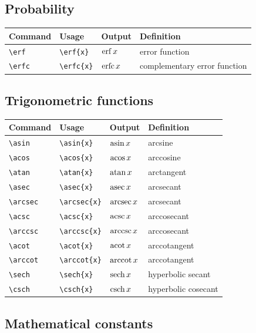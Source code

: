 \documentclass[11pt]{article}
\begin{document}
\subsection{Probability}

\begin{tabular}{llll}
    Command      & Usage           & Output     & Definition                   \\
    \hline
    \verb|\erf|  & \verb|\erf{x}|  & $\operatorname{erf}{x}$  & error function               \\
    \verb|\erfc| & \verb|\erfc{x}| & $\operatorname{erfc}{x}$ & complementary error function \\
\end{tabular}

\subsection{Trigonometric functions}

\begin{tabular}{llll}
    Command        & Usage             & Output       & Definition          \\
    \hline
    \verb|\asin|   & \verb|\asin{x}|   & $\operatorname{asin}{x}$   & arcsine             \\
    \verb|\acos|   & \verb|\acos{x}|   & $\operatorname{acos}{x}$   & arccosine           \\
    \verb|\atan|   & \verb|\atan{x}|   & $\operatorname{atan}{x}$   & arctangent          \\
    \verb|\asec|   & \verb|\asec{x}|   & $\operatorname{asec}{x}$   & arcsecant           \\
    \verb|\arcsec| & \verb|\arcsec{x}| & $\operatorname{arcsec}{x}$ & arcsecant           \\
    \verb|\acsc|   & \verb|\acsc{x}|   & $\operatorname{acsc}{x}$   & arccosecant         \\
    \verb|\arccsc| & \verb|\arccsc{x}| & $\operatorname{arccsc}{x}$ & arccosecant         \\
    \verb|\acot|   & \verb|\acot{x}|   & $\operatorname{acot}{x}$   & arccotangent        \\
    \verb|\arccot| & \verb|\arccot{x}| & $\operatorname{arccot}{x}$ & arccotangent        \\
    \verb|\sech|   & \verb|\sech{x}|   & $\operatorname{sech}{x}$   & hyperbolic secant   \\
    \verb|\csch|   & \verb|\csch{x}|   & $\operatorname{csch}{x}$   & hyperbolic cosecant \\
\end{tabular}

\subsection{Mathematical constants}
\end{document}
